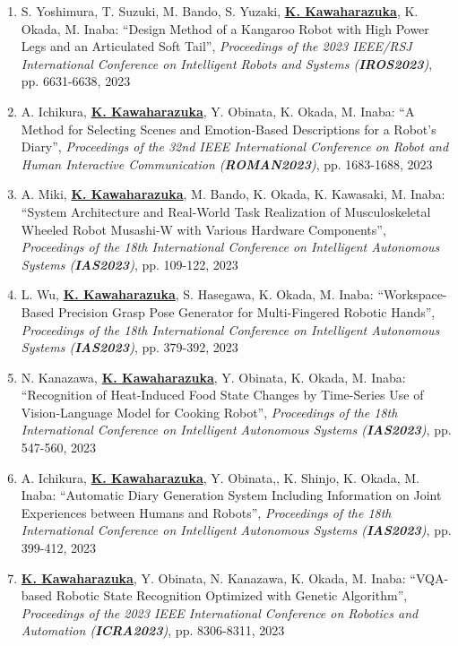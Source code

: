 \documentclass[letterpaper]{article}
\begin{document}
\begin{enumerate}
\item S. Yoshimura, T. Suzuki, M. Bando, S. Yuzaki, \underline{\textbf{K. Kawaharazuka}}, K. Okada, M. Inaba: ``Design Method of a Kangaroo Robot with High Power Legs and an Articulated Soft Tail'', \textit{Proceedings of the 2023 IEEE/RSJ International Conference on Intelligent Robots and Systems (\textit{\textbf{IROS2023}})}, pp. 6631-6638, 2023
\item A. Ichikura, \underline{\textbf{K. Kawaharazuka}}, Y. Obinata, K. Okada, M. Inaba: ``A Method for Selecting Scenes and Emotion-Based Descriptions for a Robot's Diary'', \textit{Proceedings of the 32nd IEEE International Conference on Robot and Human Interactive Communication (\textit{\textbf{ROMAN2023}})}, pp. 1683-1688, 2023
\item A. Miki, \underline{\textbf{K. Kawaharazuka}}, M. Bando, K. Okada, K. Kawasaki, M. Inaba: ``System Architecture and Real-World Task Realization of Musculoskeletal Wheeled Robot Musashi-W with Various Hardware Components'', \textit{Proceedings of the 18th International Conference on Intelligent Autonomous Systems (\textit{\textbf{IAS2023}})}, pp. 109-122, 2023
\item L. Wu, \underline{\textbf{K. Kawaharazuka}}, S. Hasegawa, K. Okada, M. Inaba: ``Workspace-Based Precision Grasp Pose Generator for Multi-Fingered Robotic Hands'', \textit{Proceedings of the 18th International Conference on Intelligent Autonomous Systems (\textit{\textbf{IAS2023}})}, pp. 379-392, 2023
\item N. Kanazawa, \underline{\textbf{K. Kawaharazuka}}, Y. Obinata, K. Okada, M. Inaba: ``Recognition of Heat-Induced Food State Changes by Time-Series Use of Vision-Language Model for Cooking Robot'', \textit{Proceedings of the 18th International Conference on Intelligent Autonomous Systems (\textit{\textbf{IAS2023}})}, pp. 547-560, 2023
\item A. Ichikura, \underline{\textbf{K. Kawaharazuka}}, Y. Obinata,, K. Shinjo, K. Okada, M. Inaba: ``Automatic Diary Generation System Including Information on Joint Experiences between Humans and Robots'', \textit{Proceedings of the 18th International Conference on Intelligent Autonomous Systems (\textit{\textbf{IAS2023}})}, pp. 399-412, 2023
\item \underline{\textbf{K. Kawaharazuka}}, Y. Obinata, N. Kanazawa, K. Okada, M. Inaba: ``VQA-based Robotic State Recognition Optimized with Genetic Algorithm'', \textit{Proceedings of the 2023 IEEE International Conference on Robotics and Automation (\textit{\textbf{ICRA2023}})}, pp. 8306-8311, 2023

\end{enumerate}
\end{document}
